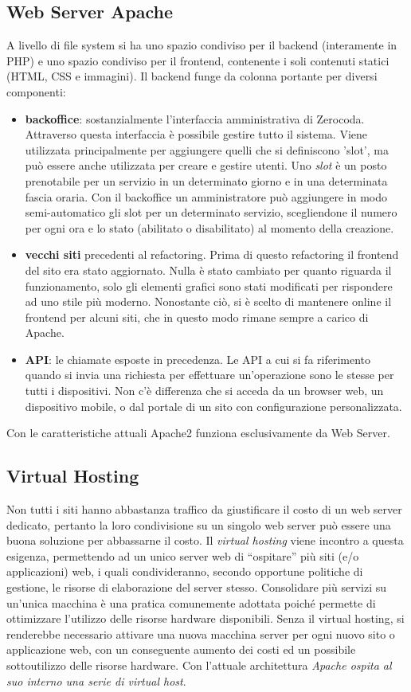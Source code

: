 \subsection{Web Server Apache}
A livello di file system si ha uno spazio condiviso per il backend (interamente in PHP) e uno spazio condiviso per il frontend, contenente i soli contenuti statici (HTML, CSS e immagini). Il backend funge da colonna portante per diversi componenti:
\begin{itemize}
    \item \textbf{backoffice}: sostanzialmente l'interfaccia amministrativa di Zerocoda. Attraverso questa interfaccia è possibile gestire tutto il sistema. Viene utilizzata principalmente per aggiungere quelli che si definiscono 'slot', ma può essere anche utilizzata per creare e gestire utenti. Uno \emph{slot} è un posto prenotabile per un servizio in un determinato giorno e in una determinata fascia oraria. Con il backoffice un amministratore può aggiungere in modo semi-automatico gli slot per un determinato servizio, scegliendone il numero per ogni ora e lo stato (abilitato o disabilitato) al momento della creazione.
    \item \textbf{vecchi siti } precedenti al refactoring. Prima di questo refactoring il frontend del sito era stato aggiornato. Nulla è stato cambiato per quanto riguarda il funzionamento, solo gli elementi grafici sono stati modificati per rispondere ad uno stile più moderno. Nonostante ciò, si è scelto di mantenere online il frontend per alcuni siti, che in questo modo rimane sempre a carico di Apache.
    \item \textbf{API}: le chiamate esposte in precedenza. Le API a cui si fa riferimento quando si invia una richiesta per effettuare un'operazione sono le stesse per tutti i dispositivi. Non c'è differenza che si acceda da un browser web, un dispositivo mobile, o dal portale di un sito con configurazione personalizzata.
\end{itemize}   
Con le caratteristiche attuali Apache2 funziona esclusivamente da Web Server.

\subsection{Virtual Hosting}
Non tutti i siti hanno abbastanza traffico da giustificare il costo di un web server dedicato, pertanto la loro condivisione su un singolo web server può essere una buona soluzione per abbassarne il costo. Il \emph{virtual hosting} viene incontro a questa esigenza, permettendo ad un unico server web di “ospitare” più siti (e/o applicazioni) web, i quali condivideranno, secondo opportune politiche di gestione, le risorse di elaborazione del server stesso. Consolidare più servizi su un’unica macchina è una pratica comunemente adottata poiché permette di ottimizzare l’utilizzo delle risorse hardware disponibili. Senza il virtual hosting, si renderebbe necessario attivare una nuova macchina server per ogni nuovo sito o applicazione web, con un conseguente aumento dei costi ed un possibile sottoutilizzo delle risorse hardware. Con l'attuale architettura \textit{Apache ospita al suo interno una serie di virtual host}.

